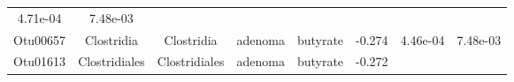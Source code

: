 \documentclass[11pt,]{article}
\begin{document}
\begin{longtable}[]{@{}cccccccc@{}}
\begin{minipage}[t]{0.08\columnwidth}
4.71e-04\strut
\end{minipage} & \begin{minipage}[t]{0.08\columnwidth}\centering\strut
7.48e-03\strut
\end{minipage}\tabularnewline
\begin{minipage}[t]{0.08\columnwidth}\centering\strut
Otu00657\strut
\end{minipage} & \begin{minipage}[t]{0.15\columnwidth}\centering\strut
Clostridia\strut
\end{minipage} & \begin{minipage}[t]{0.15\columnwidth}\centering\strut
Clostridia\strut
\end{minipage} & \begin{minipage}[t]{0.08\columnwidth}\centering\strut
adenoma\strut
\end{minipage} & \begin{minipage}[t]{0.09\columnwidth}\centering\strut
butyrate\strut
\end{minipage} & \begin{minipage}[t]{0.07\columnwidth}\centering\strut
-0.274\strut
\end{minipage} & \begin{minipage}[t]{0.08\columnwidth}\centering\strut
4.46e-04\strut
\end{minipage} & \begin{minipage}[t]{0.08\columnwidth}\centering\strut
7.48e-03\strut
\end{minipage}\tabularnewline
\begin{minipage}[t]{0.08\columnwidth}\centering\strut
Otu01613\strut
\end{minipage} & \begin{minipage}[t]{0.15\columnwidth}\centering\strut
Clostridiales\strut
\end{minipage} & \begin{minipage}[t]{0.15\columnwidth}\centering\strut
Clostridiales\strut
\end{minipage} & \begin{minipage}[t]{0.08\columnwidth}\centering\strut
adenoma\strut
\end{minipage} & \begin{minipage}[t]{0.09\columnwidth}\centering\strut
butyrate\strut
\end{minipage} & \begin{minipage}[t]{0.07\columnwidth}\centering\strut
-0.272\strut
\end{minipage} & \begin{minipage}[t]{0.08\columnwidth}\centering\strut

\end{minipage}
\end{longtable}
\end{document}
